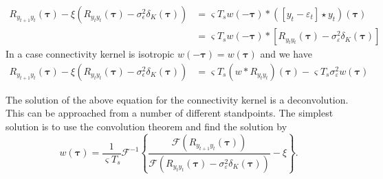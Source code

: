 \documentclass[]{article}
\begin{document}
\begin{align}
	R_{y_{t+1}y_t}(\boldsymbol{\tau})-\xi \left(R_{y_ty_t}(\boldsymbol{\tau})-\sigma_{\epsilon}^2  \delta_{K}\left(\boldsymbol\tau\right)\right) &=  \varsigma T_s  w(-\boldsymbol\tau)\ast (\left[y_t-\varepsilon_t \right] \star y_t)(\boldsymbol\tau)\nonumber \\
&= \varsigma T_s  w(-\boldsymbol\tau) \ast\left[R_{y_ty_t}(\boldsymbol\tau)-\sigma_{\varepsilon}^2\delta_K(\boldsymbol\tau) \right] 
\end{align}
In a case  connectivity kernel is isotropic $ w(-\boldsymbol\tau)= w(\boldsymbol\tau)$ and we have
\begin{align}
	R_{y_{t+1}y_t}(\boldsymbol{\tau}) -\xi \left(R_{y_ty_t}(\boldsymbol{\tau})-\sigma_{\epsilon}^2  \delta_{K}\left(\boldsymbol\tau\right)\right)& = \varsigma T_s (w\ast R_{y_ty_t})(\boldsymbol\tau)-\varsigma T_s \sigma^2_{\varepsilon}w(\boldsymbol\tau) 
\end{align}

The solution of the above equation for the connectivity kernel is a deconvolution. This can be approached from a number of different standpoints. The simplest solution is to use the convolution theorem and find the solution by 
\begin{equation}\label{eq:KernelSolution}
	w(\boldsymbol{\tau}) = \frac{1}{\varsigma T_s}\mathcal{F}^{-1}\left\{\frac{\mathcal{F}\left(R_{y_{t+1}y_t}(\boldsymbol{\tau})\right)}{\mathcal{F}\left(R_{y_ty_t}(\boldsymbol{\tau})-\sigma^2_{\varepsilon}\delta_K(\boldsymbol\tau)\right)}-\xi\right\}.
\end{equation}

\newpage
\end{document}
